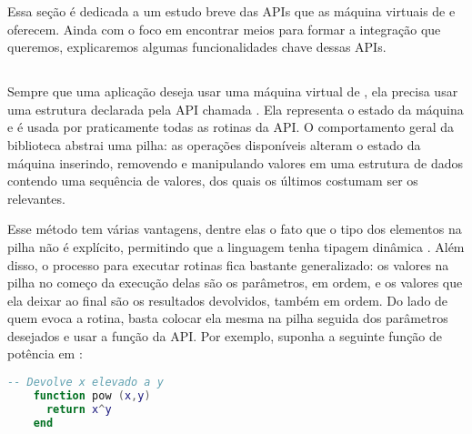     Essa seção é dedicada a um estudo breve das APIs que as máquina virtuais de
     e  oferecem. Ainda com o foco em encontrar meios
    para formar a integração que queremos, explicaremos algumas funcionalidades
    chave dessas APIs.

    \subsection{}
    \label{cap:conceitos:apis:lua}

      Sempre que uma aplicação deseja usar uma máquina virtual de ,
      ela precisa usar uma estrutura declarada pela API chamada
      . Ela representa o estado da máquina e é usada por
      praticamente todas as rotinas da API. O comportamento geral da biblioteca
      abstrai uma pilha: as operações disponíveis alteram o estado da máquina
      inserindo, removendo e manipulando valores em uma estrutura de dados
      contendo uma sequência de valores, dos quais os últimos costumam ser os
      relevantes\footnotemark{}.


      Esse método tem várias vantagens, dentre elas o fato que o tipo dos
      elementos na pilha não é explícito, permitindo que a linguagem tenha
      tipagem dinâmica \cite{pl:00}. Além disso, o processo para executar
      rotinas fica bastante generalizado: os valores na pilha no começo da
      execução delas são os parâmetros, em ordem, e os valores que ela deixar ao
      final são os resultados devolvidos, também em ordem. Do lado de quem evoca
      a rotina, basta colocar ela mesma na pilha seguida dos parâmetros
      desejados e usar a função  da API. Por exemplo, suponha
      a seguinte função de potência em :
      
      \vspace{1em}

    \begin{lstlisting}[language=lua]
    -- Devolve x elevado a y
    function pow (x,y)
      return x^y
    end
    \end{lstlisting}
      
      \vspace{1em}

